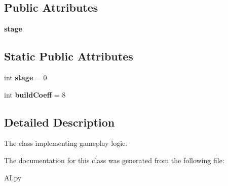 \subsection*{Public Attributes}
\begin{DoxyCompactItemize}
\item 
\hypertarget{classAI_1_1AI_aaef6cc5f313e3a1ec3e55b580fac14ca}{
{\bfseries stage}}
\label{classAI_1_1AI_aaef6cc5f313e3a1ec3e55b580fac14ca}

\end{DoxyCompactItemize}
\subsection*{Static Public Attributes}
\begin{DoxyCompactItemize}
\item 
\hypertarget{classAI_1_1AI_a7f63360325c448cc62d691c1705b7db1}{
int {\bfseries stage} = 0}
\label{classAI_1_1AI_a7f63360325c448cc62d691c1705b7db1}

\item 
\hypertarget{classAI_1_1AI_aaca1a89f8af8f3effe049e134b3b9fc6}{
int {\bfseries buildCoeff} = 8}
\label{classAI_1_1AI_aaca1a89f8af8f3effe049e134b3b9fc6}

\end{DoxyCompactItemize}


\subsection{Detailed Description}
\begin{DoxyVerb}The class implementing gameplay logic.\end{DoxyVerb}
 

The documentation for this class was generated from the following file:\begin{DoxyCompactItemize}
\item 
AI.py\end{DoxyCompactItemize}

